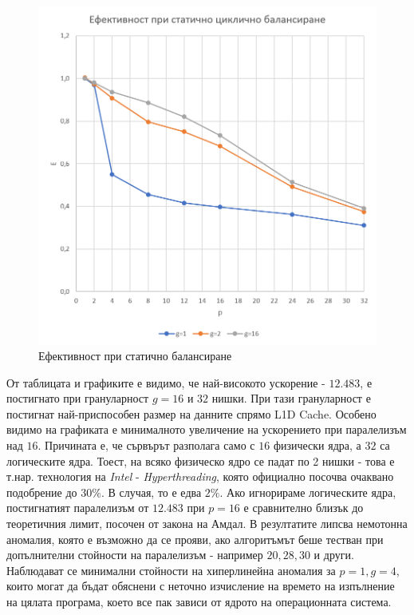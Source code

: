 \documentclass[a4paper,11pt]{article}
\begin{document}
\begin{figure}[H]
    \centering
    \includegraphics[width=0.9\linewidth]{images/StaticMandelEffectiveness.png}
    \caption{Ефективност при статично балансиране}
    \label{fig:static-effectiveness}
\end{figure}
От таблицата и графиките е видимо, че най-високото ускорение - $12.483$, е постигнато при грануларност $g=16$ и $32$ нишки. При тази грануларност е постигнат най-приспособен размер на данните спрямо L1D Cache. 
Особено видимо на графиката е минималното увеличение на ускорението при паралелизъм над $16$. Причината е, че сървърът разполага само с $16$ физически ядра, а $32$ са логическите ядра. Тоест, на всяко физическо ядро се падат по 2 нишки - това е т.нар. технология на \emph{Intel} - \emph{Hyperthreading}, която официално посочва очаквано подобрение до $30\%$. В случая, то е едва $2\%$. Ако игнорираме логическите ядра, постигнатият паралелизъм от $12.483$ при $p=16$ е сравнително близък до теоретичния лимит, посочен от закона на Амдал. 
В резултатите липсва немотонна аномалия, която е възможно да се прояви, ако алгоритъмът беше тестван при допълнителни стойности на паралелизъм - например $20, 28, 30$ и други. 
Наблюдават се минимални стойности на хиперлинейна аномалия за $p=1, g=4$, които могат да бъдат обяснени с неточно изчисление на времето на изпълнение на цялата програма, което все пак зависи от ядрото на операционната система. 
\end{document}
